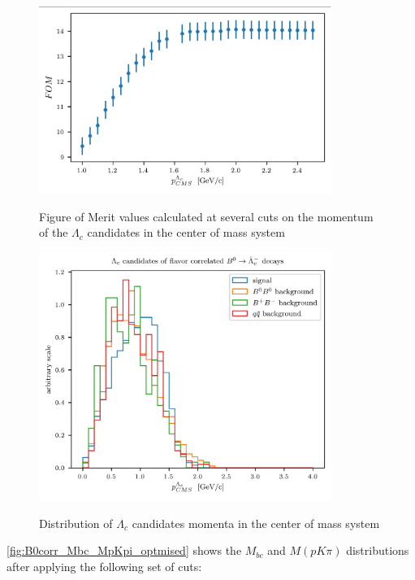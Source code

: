 \begin{figure}[H]
    {\includegraphics[width=0.85\textwidth]{03-Selection/figs/corr_B0_FOMvsCMS_Pcut.png}}
    \caption{Figure of Merit values calculated at several cuts on the momentum of the $\Lambda_c$ candidates in the center of mass system}
    \label{fig:corr_B0_FOMvsCMS_Pcut}
    \end{figure}



    \begin{figure}[H]
        {\includegraphics[width=0.85\textwidth]{03-Selection/figs/B0corr_Lambda_c_CMS_P_optimisedSigProb_R.png}}
        \caption{Distribution of  $\Lambda_c$ candidates momenta in the center of mass system}
        \label{fig:B0corr_Lambda_c_CMS_P_optimisedSigProb_R}
        \end{figure}
    

\cref{fig:B0corr_Mbc_MpKpi_optmised} shows the  $M_{bc} $ and $M(p K \pi)$ distributions after applying the following set of cuts:

